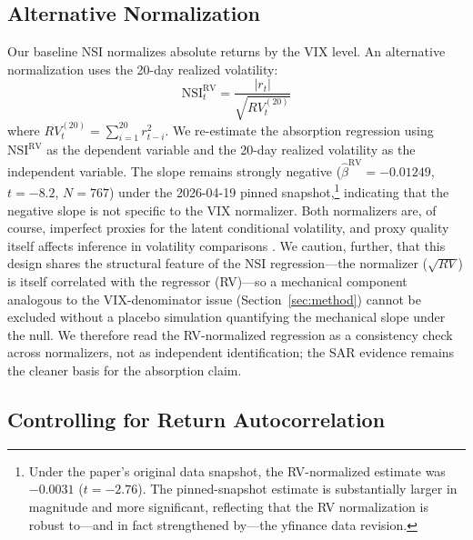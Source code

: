 \documentclass[12pt,a4paper]{article}
\begin{document}
\subsection{Alternative Normalization}

Our baseline NSI normalizes absolute returns by the VIX level. An alternative normalization uses the 20-day realized volatility:
\begin{equation}
\text{NSI}_t^{\text{RV}} = \frac{|r_t|}{\sqrt{RV_t^{(20)}}}
\label{eq:nsi_rv}
\end{equation}
where $RV_t^{(20)} = \sum_{i=1}^{20} r_{t-i}^2$. We re-estimate the absorption regression using $\text{NSI}^{\text{RV}}$ as the dependent variable and the 20-day realized volatility as the independent variable. The slope remains strongly negative ($\hat{\beta}^{\text{RV}} = -0.01249$, $t = -8.2$, $N = 767$) under the 2026-04-19 pinned snapshot,\footnote{Under the paper's original data snapshot, the RV-normalized estimate was $-0.0031$ ($t = -2.76$). The pinned-snapshot estimate is substantially larger in magnitude and more significant, reflecting that the RV normalization is robust to---and in fact strengthened by---the yfinance data revision.} indicating that the negative slope is not specific to the VIX normalizer. Both normalizers are, of course, imperfect proxies for the latent conditional volatility, and proxy quality itself affects inference in volatility comparisons \citep{patton2011}. We caution, further, that this design shares the structural feature of the NSI regression---the normalizer ($\sqrt{RV}$) is itself correlated with the regressor (RV)---so a mechanical component analogous to the VIX-denominator issue (Section~\ref{sec:method}) cannot be excluded without a placebo simulation quantifying the mechanical slope under the null. We therefore read the RV-normalized regression as a consistency check across normalizers, not as independent identification; the SAR evidence remains the cleaner basis for the absorption claim. %

\subsection{Controlling for Return Autocorrelation}
\end{document}
